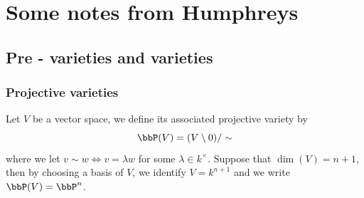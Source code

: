 \chapter{Some notes from Humphreys}
\section{Pre - varieties and varieties}
\subsection{Projective varieties}
\begin{dang}
    \begin{definition}
        Let $V$ be a vector space, we define its associated projective variety by 
        \begin{equation}
            \bbP(V) = (V\setminus0 )/ \sim 
        \end{equation}
        where we let $v\sim w\iff v=\lambda w$ for some $\lambda\in k^\times$. Suppose that $\dim(V)=n+1$, 
        then by choosing a basis of $V$, we identify $V=k^{n+1}$ and we write $\bbP(V)=\bbP^{n}$.
    \end{definition}
\end{dang}
 
